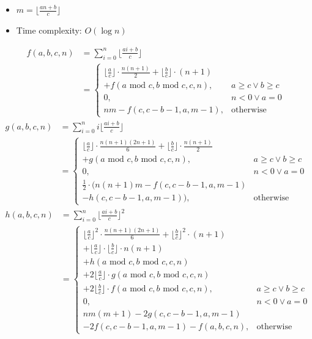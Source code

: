 \begin{itemize}
  \item $m = \lfloor\frac{an + b}{c}\rfloor$
  \item Time complexity: $O(\log{n})$
\end{itemize}

$$ \begin{aligned}
  f(a, b, c, n) &= \sum_{i = 0}^{n}\lfloor\frac{ai + b}{c}\rfloor \\
  &= \begin{cases} 
    \lfloor\frac{a}{c}\rfloor \cdot \frac{n(n + 1)}{2} + \lfloor\frac{b}{c}\rfloor \cdot (n + 1) \\ + f(a\text{ mod } c, b\text{ mod } c, c, n), & a \geq c \lor b \geq c \\ 
    0, & n < 0 \lor a = 0 \\
    nm - f(c, c - b - 1, a, m - 1), & \text{otherwise} 
  \end{cases} 
\end{aligned} $$
$$ \begin{aligned}
  g(a, b, c, n) &= \sum_{i = 0}^{n}i\lfloor\frac{ai + b}{c}\rfloor \\
  &= \begin{cases}
    \lfloor{\frac{a}{c}}\rfloor \cdot \frac{n(n + 1)(2n + 1)}{6} + \lfloor\frac{b}{c}\rfloor \cdot \frac{n(n + 1)}{2} \\ + g(a\text{ mod } c, b\text{ mod } c, c, n), & a \geq c \lor b \geq c \\
    0, & n < 0 \lor a = 0 \\
    \frac{1}{2} \cdot (n(n + 1)m - f(c, c - b - 1, a, m - 1) \\ - h(c, c - b - 1, a, m - 1)), & \text{otherwise}
  \end{cases}
\end{aligned} $$
$$ \begin{aligned}
  h(a, b, c, n) &= \sum_{i = 0}^{n}\lfloor\frac{ai + b}{c}\rfloor^2 \\
  &= \begin{cases}
    \lfloor\frac{a}{c}\rfloor^2 \cdot \frac{n(n + 1)(2n + 1)}{6} + \lfloor\frac{b}{c}\rfloor^2 \cdot (n + 1) \\ + \lfloor\frac{a}{c}\rfloor \cdot \lfloor\frac{b}{c}\rfloor \cdot n(n + 1) \\ + h(a\text{ mod } c, b\text{ mod } c, c, n) \\ + 2\lfloor\frac{a}{c}\rfloor \cdot g(a\text{ mod } c, b\text{ mod } c, c, n) \\ + 2\lfloor\frac{b}{c}\rfloor \cdot f(a\text{ mod } c, b\text{ mod } c, c, n), & a \geq c \lor b \geq c \\
    0, & n < 0 \lor a = 0 \\
    nm(m + 1) - 2g(c, c - b - 1, a, m - 1) \\ - 2f(c, c - b - 1, a, m - 1) - f(a, b, c, n), & \text{otherwise}
  \end{cases}
\end{aligned} $$
